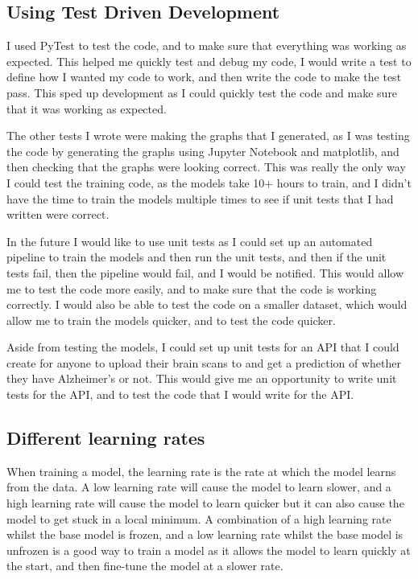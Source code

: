 \documentclass[]{final_report}
\begin{document}
\subsection{Using Test Driven Development}
I used PyTest\cite{PyTest} to test the code, and to make sure that everything was working as expected.
This helped me quickly test and debug my code, I would write a test to define how I wanted my code to work, and then write the code to make the test pass.
This sped up development as I could quickly test the code and make sure that it was working as expected.

The other tests I wrote were making the graphs that I generated, as I was testing the code by generating the graphs using Jupyter Notebook\cite{Jupyter} and matplotlib\cite{Matplotlib},
and then checking that the graphs were looking correct. This was really the only way I could test the training code, as the models take 10+ hours to train,
and I didn't have the time to train the models multiple times to see if unit tests that I had written were correct.

In the future I would like to use unit tests as I could set up an automated pipeline to train the models and then run the unit tests,
and then if the unit tests fail, then the pipeline would fail, and I would be notified. This would allow me to test the code more easily,
and to make sure that the code is working correctly. I would also be able to test the code on a smaller dataset, which would allow me to train the models quicker,
and to test the code quicker.

Aside from testing the models, I could set up unit tests for an API that I could create for anyone to upload their brain scans to and get a prediction of whether they have Alzheimer's or not.
This would give me an opportunity to write unit tests for the API, and to test the code that I would write for the API.

\subsection{Different learning rates}

When training a model, the learning rate is the rate at which the model learns from the data.
A low learning rate will cause the model to learn slower, and a high learning rate will cause the model to learn quicker
but it can also cause the model to get stuck in a local minimum. A combination of a high learning rate whilst the base model is frozen, and a low learning rate whilst the base model is unfrozen is a good way to train a model as it allows the model to learn quickly at the start, and then fine-tune the model at a slower rate.
\end{document}
